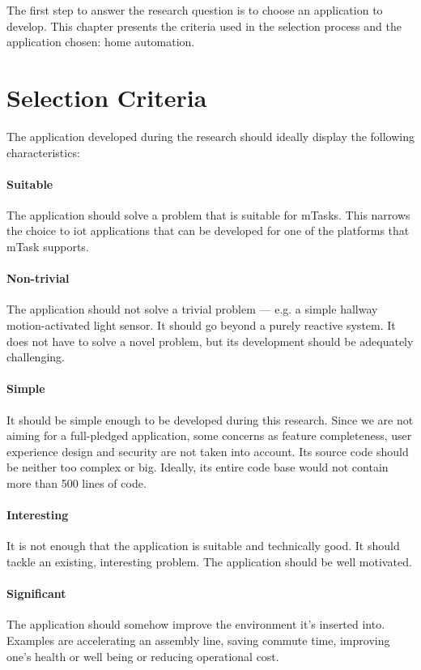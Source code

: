 The first step to answer the research question is to choose an application to develop. This chapter presents the criteria used in the selection process and the application chosen: home automation.

\section{Selection Criteria}\label{sec:selec_cri}

The application developed during the research should ideally display the following characteristics:

\paragraph{Suitable} The application should solve a problem that is suitable for mTasks. This narrows the choice to \ac{iot} applications that can be developed for one of the platforms that mTask supports.

\paragraph{Non-trivial} The application should not solve a trivial problem --- e.g. a simple hallway  motion-activated light sensor. It should go beyond a purely reactive system. It does not have to solve a novel problem, but its development should be adequately challenging.

\paragraph{Simple} It should be simple enough to be developed during this research. Since we are not aiming for a full-pledged application, some concerns as feature completeness, user experience design and security are not taken into account. Its source code should be neither too complex or big. Ideally, its entire code base would not contain more than 500 lines of code. 

\paragraph{Interesting} It is not enough that the application is suitable and technically good. It should tackle an existing, interesting problem. The application should be well motivated.

\paragraph{Significant} The application should somehow improve the environment it's inserted into. Examples are accelerating an assembly line, saving commute  time, improving one's health or well being or reducing operational cost.


